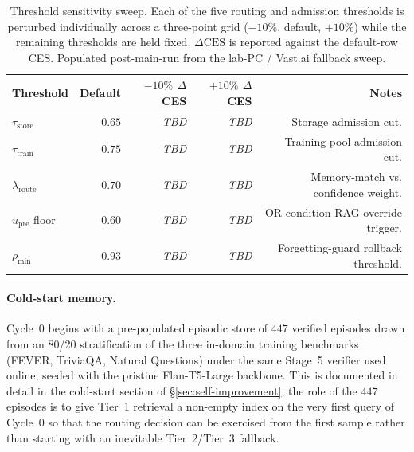 \begin{table}[t]
\centering
\caption{Threshold sensitivity sweep. Each of the five routing and
admission thresholds is perturbed individually across a three-point
grid ($-10\%$, default, $+10\%$) while the remaining thresholds are
held fixed. $\Delta\text{CES}$ is reported against the default-row
CES. Populated post-main-run from the lab-PC / Vast.ai fallback
sweep.}
\label{tab:threshold-sensitivity}
\begin{tabular}{lrrrr}
\toprule
Threshold & Default & $-10\%$ $\Delta$CES & $+10\%$ $\Delta$CES & Notes \\
\midrule
$\tau_{\text{store}}$ & $0.65$ & \textit{TBD} & \textit{TBD} & Storage admission cut. \\
$\tau_{\text{train}}$ & $0.75$ & \textit{TBD} & \textit{TBD} & Training-pool admission cut. \\
$\lambda_{\text{route}}$ & $0.70$ & \textit{TBD} & \textit{TBD} & Memory-match vs. confidence weight. \\
$u_{\text{pre}}$ floor & $0.60$ & \textit{TBD} & \textit{TBD} & OR-condition RAG override trigger. \\
$\rho_{\min}$ & $0.93$ & \textit{TBD} & \textit{TBD} & Forgetting-guard rollback threshold. \\
\bottomrule
\end{tabular}
\end{table}

\paragraph{Cold-start memory.}
Cycle~$0$ begins with a pre-populated episodic store of $447$
verified episodes drawn from an 80/20 stratification of the three
in-domain training benchmarks (FEVER, TriviaQA, Natural Questions)
under the same Stage~5 verifier used online, seeded with the pristine
Flan-T5-Large backbone. This is documented in detail in the
cold-start section of \S\ref{sec:self-improvement}; the role of the
$447$ episodes is to give Tier~1 retrieval a non-empty index on the
very first query of Cycle~$0$ so that the routing decision can be
exercised from the first sample rather than starting with an
inevitable Tier~2/Tier~3 fallback.


